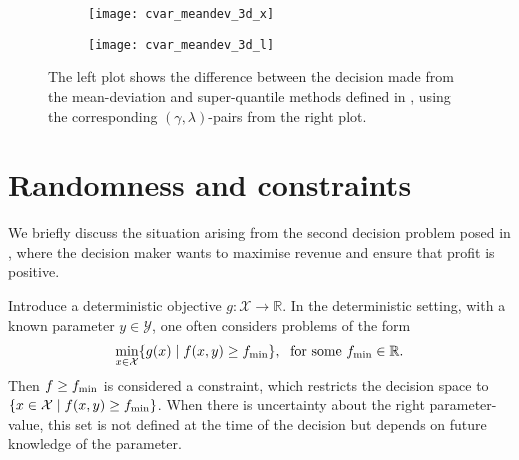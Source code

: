 \documentclass[main.tex]{subfiles}
\begin{document}
\begin{example}
  \begin{figure}[hbtp]
    \centering
    \begin{subfigure}[t]{.5\textwidth}
      \texttt{[image: cvar\_meandev\_3d\_x]}
    \end{subfigure}%
    \begin{subfigure}[t]{.5\textwidth}
      \texttt{[image: cvar\_meandev\_3d\_l]}
    \end{subfigure}
    \caption[Comparison between two decision maker models.]{The left plot shows the difference between the decision made
      from the mean-deviation and super-quantile methods defined in
      , using the corresponding
      $(\gamma,\lambda)$-pairs from the right plot.
    }\label{fig:cvar_meandev_2d}
  \end{figure}
\end{example}




\section{Randomness and
  constraints}\label{sec:one_randomness_constraints}
We briefly discuss the situation arising from the
second decision problem posed in ,
where the decision maker wants to maximise revenue and ensure that
profit is positive.

Introduce a deterministic objective $g:\mathcal{X}
\to\mathbb{R}$. In the deterministic setting, with a known parameter
$y\in\mathcal{Y}$, one often considers problems of the form
\begin{align}
  \min_{x\in\mathcal{X}}\{g(x)\mid f(x,y)\geq f_{\textnormal{min}} \},\;
  \text{ for some } f_{\textnormal{min}}\in\mathbb{R}.
\end{align}
Then $f\geq f_{\textnormal{min}}$ is considered a constraint, which restricts the
decision space to $\{x\in\mathcal{X}\mid f(x,y)\geq f_{\textnormal{min}}\}$.
When there is uncertainty about the right parameter-value, this set is
not defined at the time of the decision but depends on future knowledge
of the parameter.
\end{document}
